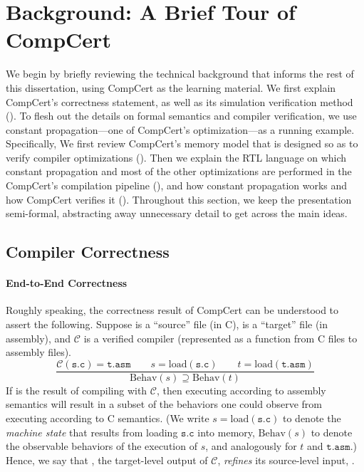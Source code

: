 \section{Background: A Brief Tour of CompCert}
\label{sec:background}

We begin by briefly reviewing the technical background that informs the rest of this dissertation,
using CompCert as the learning material.  We first explain CompCert's correctness statement, as well
as its simulation verification method ().  To flesh out the details
on formal semantics and compiler verification, we use constant propagation---one of CompCert's
optimization---as a running example.  Specifically, We first review CompCert's memory model that is
designed so as to verify compiler optimizations ().  Then we explain the
RTL language on which constant propagation and most of the other optimizations are performed in the
CompCert's compilation pipeline (), and how constant propagation works and
how CompCert verifies it ().  Throughout this section, we keep the
presentation semi-formal, abstracting away unnecessary detail to get across the main ideas.



\subsection{Compiler Correctness}
\label{sec:background:correctness}

\paragraph{End-to-End Correctness}

Roughly speaking, the correctness result of CompCert can be understood to assert the following.
Suppose  is a ``source'' file (in C),  is a ``target'' file (in assembly), and
$\mathcal{C}$ is a verified compiler (represented as a function from C files to assembly files).
\[
\frac{
\mathcal{C}(\mathtt{s.c}) = \mathtt{t.asm} \qquad
s = \mathrm{load}(\mathtt{s.c})\qquad
t = \mathrm{load}(\mathtt{t.asm})}
{\mathrm{Behav}(s) \supseteq \mathrm{Behav}(t)}
\]
If  is the result of compiling  with $\mathcal{C}$, then executing
 according to assembly semantics will result in a subset of the behaviors one could
observe from executing  according to C semantics.  (We write
$s = \mathrm{load}(\mathtt{s.c})$ to denote the \emph{machine state} that results from loading
$\mathtt{s.c}$ into memory, $\mathrm{Behav}(s)$ to denote the observable behaviors of the execution
of $s$, and analogously for $t$ and $\mathtt{t.asm}$.)  Hence, we say that , the
target-level output of $\mathcal{C}$, \emph{refines} its source-level input, .


